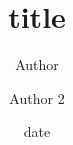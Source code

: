 \documentclass{amsart}
\title{title}
\author{Author}
\author{Author 2}
\date{date}
\begin{document}
\begin{abstract}
\blindtext
\end{abstract}

\maketitle

\blindmathpaper
\end{document}
